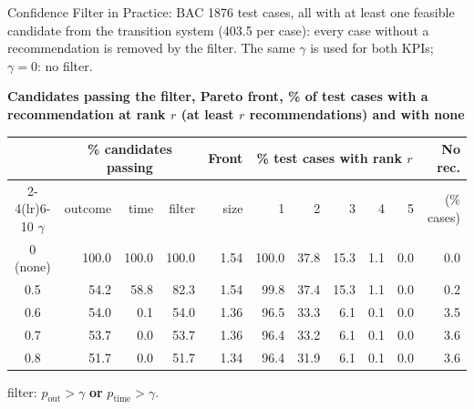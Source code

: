 \documentclass[aspectratio=169]{beamer} %
\begin{document}
\begin{frame}{Confidence Filter in Practice: BAC}
  \small
  1876 test cases, \alert{all} with at least one feasible candidate from the transition system
  (403.5 per case): every case without a recommendation is removed by the filter. The same $\gamma$ is used for
  both KPIs; $\gamma = 0$: no filter.

  \textbf{Candidates passing the filter, Pareto front, \% of test cases with a recommendation at rank $r$ (at least $r$ recommendations) and with none}
  \begin{center}\setlength{\tabcolsep}{4pt}\setlength{\aboverulesep}{0pt}\setlength{\belowrulesep}{1pt}
  \begin{tabular}{crrrrrrrrrr}
    \toprule
     & \multicolumn{3}{c}{\% candidates passing} & Front & \multicolumn{5}{c}{\% test cases with rank $r$} & No rec. \\
    \cmidrule(lr){2-4}\cmidrule(lr){6-10}
    $\gamma$ & outcome & time & filter & size & 1 & 2 & 3 & 4 & 5 & (\% cases) \\
    \midrule
    0 (none) & 100.0 & 100.0 & 100.0 & 1.54 & 100.0 & 37.8 & 15.3 & 1.1 & 0.0 & 0.0 \\
    0.5      & 54.2  & 58.8  & 82.3  & 1.54 & 99.8  & 37.4 & 15.3 & 1.1 & 0.0 & 0.2 \\
    0.6      & 54.0  & 0.1   & 54.0  & 1.36 & 96.5  & 33.3 & 6.1  & 0.1 & 0.0 & 3.5 \\
    0.7      & 53.7  & 0.0   & 53.7  & 1.36 & 96.4  & 33.2 & 6.1  & 0.1 & 0.0 & 3.6 \\
    0.8      & 51.7  & 0.0   & 51.7  & 1.34 & 96.4  & 31.9 & 6.1  & 0.1 & 0.0 & 3.6 \\
    \bottomrule
  \end{tabular}
  \end{center}
  {\scriptsize filter: $p_{\text{out}} > \gamma$ \textbf{or} $p_{\text{time}} > \gamma$.}
\end{frame}
\end{document}
